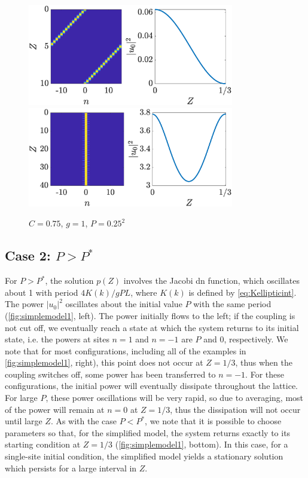 \documentclass[reprint, amsmath,amssymb,aps,pre]{revtex4-2}
\begin{document}
\begin{figure}
    \centering
    \includegraphics[width=9cm]{leftsimplifiedcomplete}
    \includegraphics[width=9cm]{statsimplifiedcomplete}
    \caption{$C=0.75$, $g=1$, $P=0.25^2$}
    \label{fig:simplecomplete}
\end{figure}

\subsection{\texorpdfstring{Case 2: $P > P^*$}{Case 1: P > Pstar}}

For $P > P^*$, the solution $p(Z)$ involves the Jacobi dn function, which oscillates about 1 with period $4 K(k)/gPL$, where $K(k)$ is defined by \cref{eq:Kellipticint}. The power $|u_0|^2$ oscillates about the initial value $P$ with the same period (\cref{fig:simplemodel1}, left).
The power initially flows to the left; if the coupling is not cut off, we eventually reach a state at which the system returns to its initial state, i.e. the powers at sites $n=1$ and $n=-1$ are $P$ and 0, respectively. We note that for most configurations, including all of the examples in \cref{fig:simplemodel1}, right), this point does not occur at $Z=1/3$, thus when the coupling switches off, some power has been transferred to $n=-1$. For these configurations, the initial power will eventually dissipate throughout the lattice. For large $P$, these power oscillations will be very rapid, so due to averaging, most of the power will remain at $n=0$ at $Z=1/3$, thus the dissipation will not occur until large $Z$. 
As with the case $P<P^*$, we note that it is possible to choose parameters so that, for the simplified model, the system returns exactly to its starting condition at $Z=1/3$ (\cref{fig:simplemodel1}, bottom). In this case, for a single-site initial condition, the simplified model yields a stationary solution which persists for a large interval in $Z$.
\end{document}

